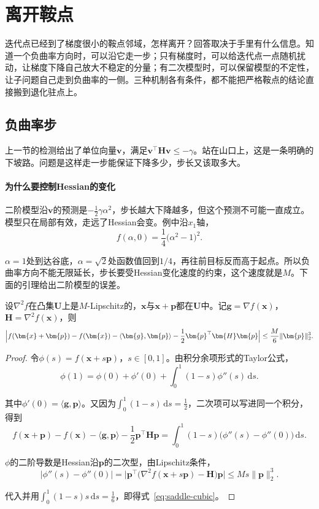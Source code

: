 \section{离开鞍点}
\label{sec:saddle-escape}

迭代点已经到了梯度很小的鞍点邻域，怎样离开？回答取决于手里有什么信息。知道一个负曲率方向时，可以沿它走一步；只有梯度时，可以给迭代点一点随机扰动，让梯度下降自己放大不稳定的分量；有二次模型时，可以保留模型的不定性，让子问题自己走到负曲率的一侧。三种机制各有条件，都不能把严格鞍点的结论直接搬到退化驻点上。

\subsection{负曲率步}
\label{sec:saddle-nc-step}

上一节的检测给出了单位向量$\bm{v}$，满足$\bm{v}^\top\bm{H}\bm{v}\leq-\gamma$。站在山口上，这是一条明确的下坡路。问题是这样走一步能保证下降多少，步长又该取多大。

\paragraph{为什么要控制Hessian的变化}
二阶模型沿$\bm{v}$的预测是$-\tfrac12\gamma\alpha^2$，步长越大下降越多，但这个预测不可能一直成立。模型只在局部有效，走远了Hessian会变。例中沿$x_1$轴，
\[
 f(\alpha,0)=\frac14\bigl(\alpha^2-1\bigr)^2.
\]

$\alpha=1$处到达谷底，$\alpha=\sqrt2$处函数值回到$1/4$，再往前目标反而高于起点。所以负曲率方向不能无限延长，步长要受Hessian变化速度的约束，这个速度就是$M$。下面的引理给出二阶模型的误差。

\begin{lemma}[三次上界]
 \label{lem:saddle-cubic}
 设$\nabla^2f$在凸集$\bm{U}$上是$M$-Lipschitz的，$\bm{x}$与$\bm{x}+\bm{p}$都在$\bm{U}$中。记$\bm{g}=\nabla f(\bm{x})$，$\bm{H}=\nabla^2f(\bm{x})$，则
 \begin{equation}
  \Bigl\lvert f(\bm{x}+\bm{p})-f(\bm{x})-\langle\bm{g},\bm{p}\rangle-\frac12\bm{p}^\top\bm{H}\bm{p}\Bigr\rvert
  \leq\frac{M}{6}\lVert\bm{p}\rVert_2^3.
  \label{eq:saddle-cubic}
 \end{equation}
\end{lemma}

\begin{proof}
 令$\phi(s)=f(\bm{x}+s\bm{p})$，$s\in[0,1]$。由积分余项形式的Taylor公式，
 \[
  \phi(1)=\phi(0)+\phi'(0)+\int_0^1(1-s)\phi''(s)\,\mathrm{d}s.
 \]

 其中$\phi'(0)=\langle\bm{g},\bm{p}\rangle$。又因为$\int_0^1(1-s)\,\mathrm{d}s=\tfrac12$，二次项可以写进同一个积分，得到
 \[
  f(\bm{x}+\bm{p})-f(\bm{x})-\langle\bm{g},\bm{p}\rangle-\frac12\bm{p}^\top\bm{H}\bm{p}
  =\int_0^1(1-s)\bigl(\phi''(s)-\phi''(0)\bigr)\,\mathrm{d}s.
 \]

 $\phi$的二阶导数是Hessian沿$\bm{p}$的二次型，由Lipschitz条件，
 \[
  \lvert\phi''(s)-\phi''(0)\rvert
  =\bigl\lvert\bm{p}^\top\bigl(\nabla^2f(\bm{x}+s\bm{p})-\bm{H}\bigr)\bm{p}\bigr\rvert
  \leq Ms\lVert\bm{p}\rVert_2^3.
 \]

 代入并用$\int_0^1(1-s)s\,\mathrm{d}s=\tfrac16$，即得式~\eqref{eq:saddle-cubic}。
\end{proof}

